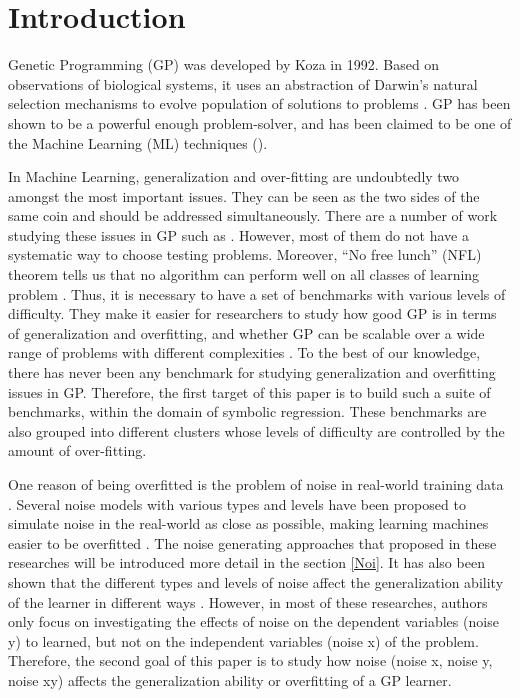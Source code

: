 \section{Introduction}
\label{Int}
Genetic Programming (GP) was developed by Koza \cite {1992Koza} in 1992. Based on observations of biological systems, it uses an abstraction of Darwin’s natural selection mechanisms to evolve population of solutions to problems \cite{2008Poli}. GP has been shown to be a powerful enough problem-solver, and has been claimed to be one of the Machine Learning (ML) techniques (\cite{2008Poli}). \par

In Machine Learning, generalization and over-fitting are undoubtedly two amongst the most important issues. They can be seen as the two sides of the same coin and should be addressed simultaneously. There are a number of work studying these issues in GP such as \cite{Fit2013}\cite{Goncalves2012}\cite{Goncalves2013}\cite{Hie2014}\cite{Hien2012}\cite{Uy2010}\cite{2014Uy}\cite{lu2018genetic}\cite{kurtoglu2017fiber}\cite{la2018multidimensional}\cite{haeri2017statistical}. However, most of them do not have a systematic way to choose testing problems. Moreover, “No free lunch” (NFL) theorem tells us that no algorithm can perform well on all classes of learning problem \cite{1996David}. Thus, it is necessary to have a set of benchmarks with various levels of difficulty. They make it easier for researchers to study how good GP is in terms of generalization and overfitting, and whether GP can be scalable over a wide range of problems with different complexities . To the best of our knowledge, there has never been any benchmark for studying generalization and overfitting issues in GP. Therefore, the first target of this paper is to build such a suite of benchmarks, within the domain of symbolic regression. These benchmarks are also grouped into different clusters whose levels of difficulty are controlled by the amount of over-fitting. \par

One reason of being overfitted is the problem of noise in real-world training data \cite{1999Liu}. Several noise models with various types and levels have been proposed to simulate noise in the real-world as close as possible, making learning machines easier to be overfitted \cite{1994Mark}\cite{1996Hic}\cite{2003Eli}\cite{2007Daz}. The noise generating approaches that proposed in these researches will be introduced more detail in the section \ref{Noi}. It has also been shown that the different types and levels of noise affect the generalization ability of the learner in different ways \cite{2011Nic}\cite{2012Loh}\cite{2014Fré}\cite{silva2017semi}\cite{gonccalves2017exploration}\cite{miranda2017noisy}. However, in most of these researches, authors only focus on investigating the effects of noise on the dependent variables (noise y) to learned, but not on the independent variables (noise x) of the problem. Therefore, the second goal of this paper is to study how noise (noise x, noise y, noise xy) affects the generalization ability or overfitting of a GP learner. 


